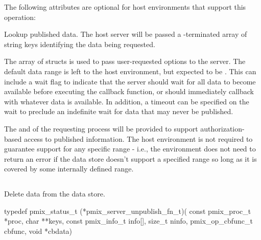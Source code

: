 
\reqattrend

\optattrstart
The following attributes are optional for host environments that support this operation:


\optattrend


\descr

Lookup published data.
The host server will be passed a -terminated array of string keys identifying the data being requested.

The array of  structs is used to pass user-requested options to the server. The default data range is left to the host environment, but expected to be .
This can include a wait flag to indicate that the server should wait for all data to become available before executing the callback function, or should immediately callback with whatever data is available.
In addition, a timeout can be specified on the wait to preclude an indefinite wait for data that may never be published.

\advicermstart
The  and  of the requesting process will be provided to support authorization-based access to published information. The host environment is not required to guarantee support for any specific range - i.e., the environment does not need to return an error if the data store doesn't support a specified range so long as it is covered by some internally defined range.
\advicermend

\subsection{}

\summary

Delete data from the data store.

\format

\cspecificstart
\begin{codepar}
typedef pmix_status_t (*pmix_server_unpublish_fn_t)(
                             const pmix_proc_t *proc,
                             char **keys,
                             const pmix_info_t info[],
                             size_t ninfo,
                             pmix_op_cbfunc_t cbfunc,
                             void *cbdata)
\end{codepar}
\cspecificend

